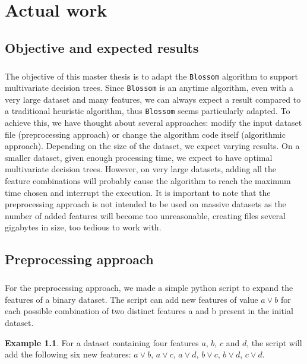 \documentclass[12pt]{report}
\theoremstyle{definition}
\newtheorem*{example}{Example}
\theoremstyle{definition}
\theoremstyle{definition}
\begin{document}
\chapter{Actual work}
\section{Objective and expected results} %
\paragraph{} The objective of this master thesis is to adapt the \texttt{Blossom} algorithm to support multivariate
decision trees. Since \texttt{Blossom} is an anytime algorithm, even with a very large dataset and many features,
we can always expect a result compared to a traditional heuristic algorithm, thus \texttt{Blossom} seems particularly
adapted. To achieve this, we have thought about several approaches: modify the input dataset file (preprocessing approach)
or change the algorithm code itself (algorithmic approach). Depending on the size of the dataset, we expect varying results.
On a smaller dataset, given enough processing time, we expect to have optimal multivariate decision trees. However, on very
large datasets, adding all the feature combinations will probably cause the algorithm to reach the maximum time chosen and
interrupt the execution. It is important to note that the preprocessing approach is not intended to be used on massive
datasets as the number of added features will become too unreasonable, creating files several gigabytes in size, too
tedious to work with.


\section{Preprocessing approach}
\paragraph{} For the preprocessing approach, we made a simple python script to expand the features of a binary
dataset. The script can add new features of value $a \lor b$ for each possible combination of two distinct
features a and b present in the initial dataset.

\begin{example}
    For a dataset containing four features $a$, $b$, $c$ and $d$, the script will add the following six new
    features: $a \lor b$, $a \lor c$, $a \lor d$, $b \lor c$, $b \lor d$, $c \lor d$.
\end{example}
\end{document}
